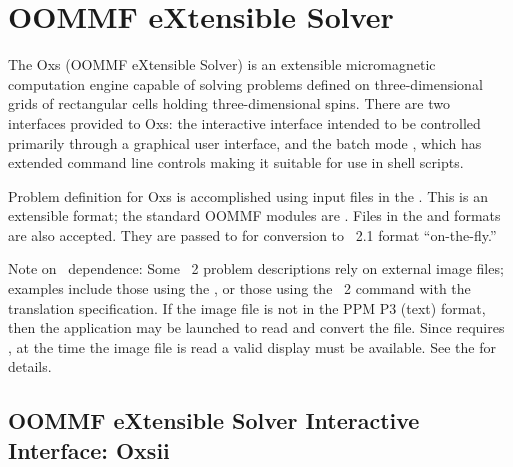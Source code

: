 \section{OOMMF eXtensible Solver}\label{sec:oxs}%
The Oxs (OOMMF eXtensible Solver) is an extensible micromagnetic
computation engine capable of solving problems defined on
three-dimensional grids of rectangular cells holding three-dimensional
spins.  There are two interfaces provided to Oxs: the interactive
interface
intended to be controlled primarily through a graphical
user interface, and the batch mode
, which has extended
command line controls making it suitable for use in shell scripts.

Problem definition for Oxs is accomplished using input files in the
.
This is an extensible format; the standard OOMMF modules are
.
Files in the  and
 formats are also accepted.  They are
passed to  for conversion to \MIF~2.1 format
``on-the-fly.''

Note on \Tk\ dependence: Some \MIF~2 problem descriptions rely on
external image files; examples
include those using the
%
, or those using the \MIF~2
 command with the 
translation specification.
If the image file is not in the PPM P3 (text) format, then the
 application may be
launched to read and convert the file.  Since 
requires \Tk, at the
time the image file is read a valid display must be available.  See the
{} for details.

\subsection{OOMMF eXtensible Solver Interactive Interface:
Oxsii}\label{sec:oxsii}%

